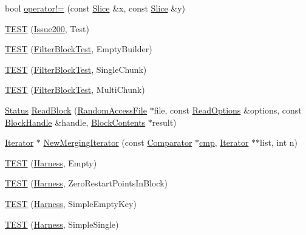 \begin{DoxyCompactItemize}
bool \hyperlink{namespaceleveldb_a6592a36834e5a52b66cc8357c7ef806b}{operator!=} (const \hyperlink{classleveldb_1_1_slice}{Slice} \&x, const \hyperlink{classleveldb_1_1_slice}{Slice} \&y)
\item 
\hyperlink{namespaceleveldb_a5052c77c33dedcb489acd0c29f6bfcb3}{T\+E\+S\+T} (\hyperlink{classleveldb_1_1_issue200}{Issue200}, Test)
\item 
\hyperlink{namespaceleveldb_a8360ab2a7a18ca54cbb3e99d80440248}{T\+E\+S\+T} (\hyperlink{classleveldb_1_1_filter_block_test}{Filter\+Block\+Test}, Empty\+Builder)
\item 
\hyperlink{namespaceleveldb_a9eb56f9aedd874d7e877b5b0e3737854}{T\+E\+S\+T} (\hyperlink{classleveldb_1_1_filter_block_test}{Filter\+Block\+Test}, Single\+Chunk)
\item 
\hyperlink{namespaceleveldb_aa7a90a751773a0c3e22a0fe0c1b67c14}{T\+E\+S\+T} (\hyperlink{classleveldb_1_1_filter_block_test}{Filter\+Block\+Test}, Multi\+Chunk)
\item 
\hyperlink{classleveldb_1_1_status}{Status} \hyperlink{namespaceleveldb_a63198fc7656081fd62695dade629790b}{Read\+Block} (\hyperlink{classleveldb_1_1_random_access_file}{Random\+Access\+File} $\ast$file, const \hyperlink{structleveldb_1_1_read_options}{Read\+Options} \&options, const \hyperlink{classleveldb_1_1_block_handle}{Block\+Handle} \&handle, \hyperlink{structleveldb_1_1_block_contents}{Block\+Contents} $\ast$result)
\item 
\hyperlink{classleveldb_1_1_iterator}{Iterator} $\ast$ \hyperlink{namespaceleveldb_ab8bdbd2babe772234f8dee1bc4f44eb5}{New\+Merging\+Iterator} (const \hyperlink{structleveldb_1_1_comparator}{Comparator} $\ast$\hyperlink{table__test_8cc_a87863e435922f0910ca8db43f02a6c0b}{cmp}, \hyperlink{classleveldb_1_1_iterator}{Iterator} $\ast$$\ast$list, int n)
\item 
\hyperlink{namespaceleveldb_a13cda371e30ed51c6ac118444cc30b67}{T\+E\+S\+T} (\hyperlink{classleveldb_1_1_harness}{Harness}, Empty)
\item 
\hyperlink{namespaceleveldb_af55d0693f84c040c3bf5ef986c6ad27e}{T\+E\+S\+T} (\hyperlink{classleveldb_1_1_harness}{Harness}, Zero\+Restart\+Points\+In\+Block)
\item 
\hyperlink{namespaceleveldb_a1311d3380969292aaeb1c4588b7633f6}{T\+E\+S\+T} (\hyperlink{classleveldb_1_1_harness}{Harness}, Simple\+Empty\+Key)
\item 
\hyperlink{namespaceleveldb_ae9364038df96fa10c379139b73101bb3}{T\+E\+S\+T} (\hyperlink{classleveldb_1_1_harness}{Harness}, Simple\+Single)
$$
\end{DoxyCompactItemize}
